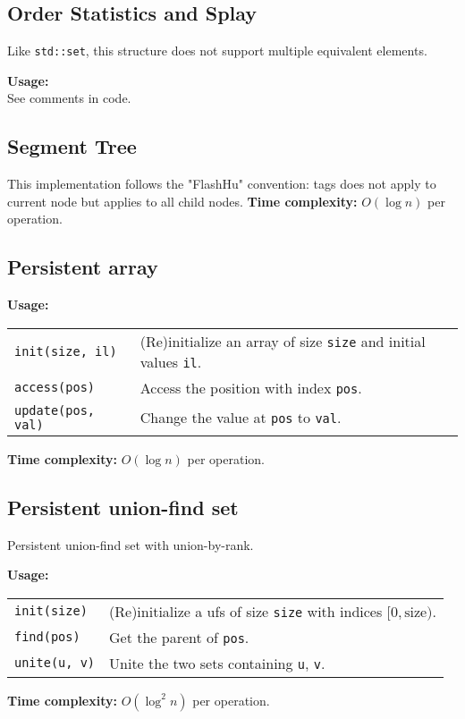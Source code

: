 \subsection{Order Statistics and Splay}
\Warning Like \lstinline|std::set|, this structure does not support multiple equivalent elements. \par
\textbf{Usage:} \\[0.1cm]
See comments in code.



\subsection{Segment Tree}
This implementation follows the "FlashHu" convention: tags does not apply to current node but applies to all child nodes.
\textbf{Time complexity:} $O(\log n)$ per operation. \par


\subsection{Persistent array}
\textbf{Usage:} \\[0.1cm]
\begin{tabular}{p{4cm} p{7.5cm}}
  \lstinline|init(size, il)| & (Re)initialize an array of size \lstinline|size| and initial values \lstinline|il|. \\
  \lstinline|access(pos)| & Access the position with index \lstinline|pos|.\\
  \lstinline|update(pos, val)| & Change the value at \lstinline|pos| to \lstinline|val|. \\
\end{tabular} \par
\textbf{Time complexity:} $O(\log n)$ per operation. \par


\subsection{Persistent union-find set}
Persistent union-find set with union-by-rank. \par
\textbf{Usage:} \\[0.1cm]
\begin{tabular}{p{4cm} p{7.5cm}}
  \lstinline|init(size)| & (Re)initialize a ufs of size \lstinline|size| with indices $[0, \mathrm{size})$. \\
  \lstinline|find(pos)| & Get the parent of \lstinline|pos|.\\
  \lstinline|unite(u, v)| & Unite the two sets containing \lstinline|u|, \lstinline|v|. \\
\end{tabular} \par
\textbf{Time complexity:} $O(\log^2 n)$ per operation. \par


